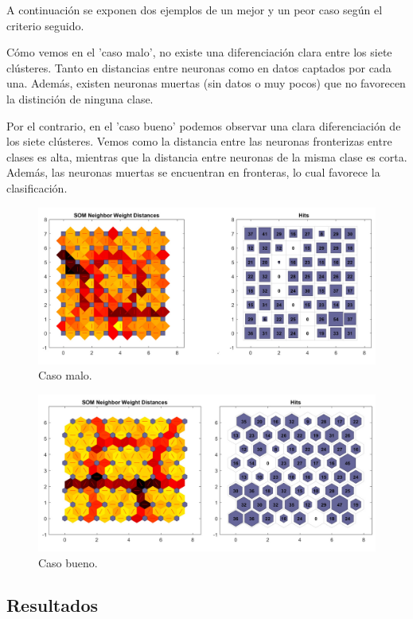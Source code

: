 \documentclass[a4paper,12pt,titlepage]{article}
\begin{document}
A continuación se exponen dos ejemplos de un mejor y un peor caso según el criterio seguido. 

Cómo vemos en el 'caso malo', no existe una diferenciación clara entre los siete clústeres. Tanto en distancias entre neuronas como en datos captados por cada una. Además, existen neuronas muertas (sin datos o muy pocos) que no favorecen la distinción de ninguna clase.

Por el contrario, en el 'caso bueno' podemos observar una clara diferenciación de los siete clústeres. Vemos como la distancia entre las neuronas fronterizas entre clases es alta, mientras que la distancia entre neuronas de la misma clase es corta. Además, las neuronas muertas se encuentran en fronteras, lo cual favorece la clasificación.

\begin{figure}[!ht]
	\centering
	\label{fig:caso-malo}
	\includegraphics[width=\textwidth]{caso-malo.jpg}
	\caption{Caso malo.}
\end{figure}

\begin{figure}[!ht]
	\centering
	\label{fig:caso-bueno}
	\includegraphics[width=\textwidth]{caso-bueno.jpg}
	\caption{Caso bueno.}
\end{figure}

\subsection{Resultados}
\end{document}
